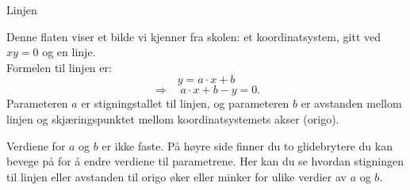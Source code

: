 \documentclass[no]{./../../common/SurferDesc}%
\begin{document}
\footnotesize
%
 
\begin{surferPage}
  \begin{surferTitle}Linjen\end{surferTitle}
   \begin{surferText}
   
Denne flaten viser et bilde vi kjenner fra skolen: et koordinatsystem, gitt ved $xy=0$ og en linje. \\Formelen til linjen er:
\[y=a\cdot x + b\]
\[ \Rightarrow \quad a\cdot x +b -y=0.\]
Parameteren $a$ er stigningstallet til linjen, og parameteren $b$ er avstanden mellom linjen og skjæringspunktet mellom koordinatsystemets akser (origo). 
\newline \newline

Verdiene for $a$ og $b$ er ikke faste. På høyre side finner du to glidebrytere du kan bevege på 
for å endre verdiene til parametrene. Her kan du se hvordan stigningen til linjen eller avstanden 
til origo øker eller minker for ulike verdier av $a$ og $b$.
     \end{surferText}
\end{surferPage}
\end{document}
